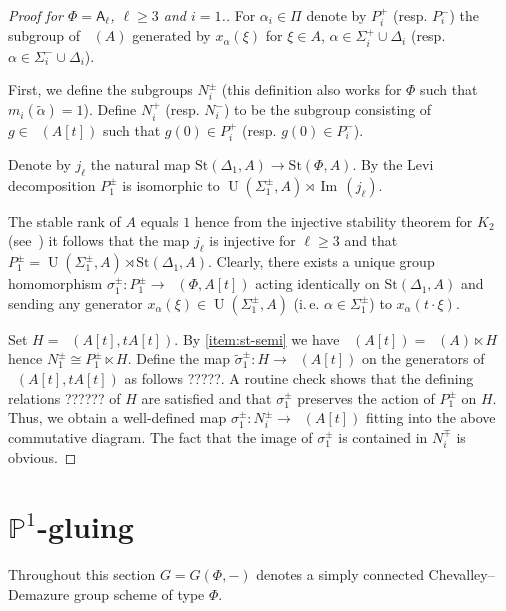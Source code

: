 \documentclass[oneside,12pt]{amsart}
\numberwithin{equation}{section}
\numberwithin{lem}{section}
\theoremstyle{definition}
\theoremstyle{remark}
\DeclareMathOperator{\UU}{U}
\DeclareMathOperator{\St}{St^G}
\DeclareMathOperator{\im}{Im\,}
\newcommand{\Stb}{\mathrm{St}}
\newcommand{\Pro}{\mathbb{P}}
\newcommand{\rA}{\mathsf{A}}
\begin{document}
\begin{proof}[Proof for $\Phi=\rA_\ell$, $\ell\geq 3$ and $i=1$.]
 For $\alpha_i\in\Pi$ denote by $P_i^+$ (resp. $P_i^-$) the subgroup of $\St(A)$ generated by
 $x_\alpha(\xi)$ for $\xi \in A$, $\alpha\in\Sigma_i^+ \cup \Delta_i$ (resp. $\alpha\in\Sigma_i^- \cup \Delta_i$).

 First, we define the subgroups $N_i^\pm$ (this definition also works for $\Phi$ such that $m_i(\widetilde{\alpha})=1$).
 Define $N_{i}^+$ (resp. $N_i^-$) to be the subgroup consisting of $g \in \St(A[t])$ such that $g(0) \in P_i^+$ (resp. $g(0) \in P_i^-$).

 Denote by $j_\ell$ the natural map $\Stb(\Delta_1, A)\to \Stb(\Phi, A)$.
 By the Levi decomposition $P_1^\pm$ is isomorphic to $\UU(\Sigma_1^\pm, A) \rtimes \im(j_\ell)$.

 The stable rank of $A$ equals $1$ hence from the injective stability theorem for $K_2$ (see~\cite[Theorem~4.1]{ST76}) it follows that the map $j_\ell$ is injective for $\ell \geq 3$
 and that $P_1^\pm = \UU(\Sigma_1^\pm, A) \rtimes \Stb(\Delta_1,A)$.
 Clearly, there exists a unique group homomorphism $\sigma_1^\pm \colon P_1^\pm \to \St(\Phi, A[t])$ acting identically on $\Stb(\Delta_1, A)$ and sending
 any generator $x_\alpha(\xi) \in \UU(\Sigma_1^\pm, A)$ (i.\,e. $\alpha\in\Sigma_1^\pm$) to $x_\alpha(t\cdot \xi)$.


 Set $H=\St(A[t], tA[t])$.
 By \cref{item:st-semi} we have $\St(A[t]) = \St(A) \ltimes H$ hence $N_1^\pm \cong P_1^\pm \ltimes H.$
 Define the map $\widetilde{\sigma}^\pm_1 \colon H \to \St(A[t])$ on the generators of $\St(A[t], tA[t])$ as follows ?????.
 A routine check shows that the defining relations ?????? of $H$ are satisfied and that $\sigma_1^\pm$ preserves the action of $P_1^\pm$ on $H$.
 Thus, we obtain a well-defined map $\sigma_1^\pm:N_i^\pm \to \St(A[t])$ fitting into the above commutative diagram.
 The fact that the image of $\sigma_1^\pm$ is contained in $N_i^\mp$ is obvious.
 \renewcommand{\qedsymbol}{} \end{proof}

\section{\texorpdfstring{$\Pro^1$}{P\textonesuperior}-gluing}
Throughout this section $G=G(\Phi, -)$ denotes a simply connected Chevalley--Demazure group scheme of type $\Phi$.
\end{document}
